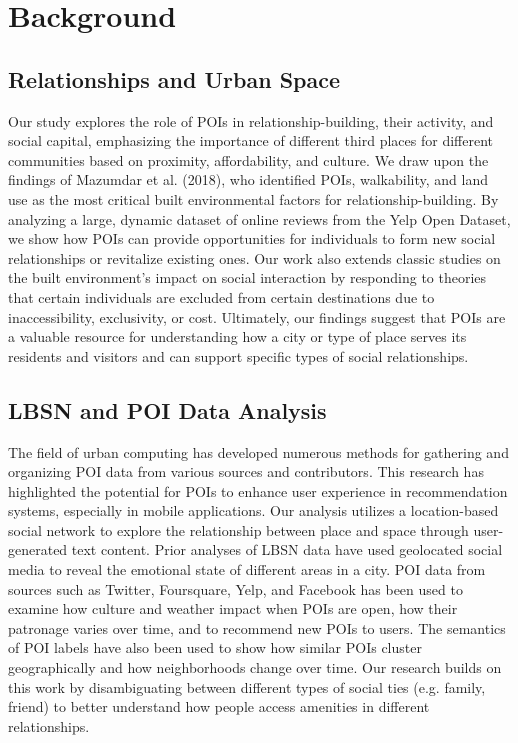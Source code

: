 \section{Background}
\subsection{Relationships and Urban Space}

Our study explores the role of POIs in relationship-building, their activity, and social capital, emphasizing the importance of different third places for different communities based on proximity, affordability, and culture\cite{b3}. We draw upon the findings of Mazumdar et al. (2018), who identified POIs, walkability, and land use as the most critical built environmental factors for relationship-building. By analyzing a large, dynamic dataset of online reviews from the Yelp Open Dataset, we show how POIs can provide opportunities for individuals to form new social relationships or revitalize existing ones. Our work also extends classic studies on the built environment's impact on social interaction by responding to theories that certain individuals are excluded from certain destinations due to inaccessibility, exclusivity, or cost. Ultimately, our findings suggest that POIs are a valuable resource for understanding how a city or type of place serves its residents and visitors and can support specific types of social relationships.

\subsection{LBSN and POI Data Analysis}
The field of urban computing has developed numerous methods for gathering and organizing POI data from various sources and contributors\cite{b4}. This research has highlighted the potential for POIs to enhance user experience in recommendation systems, especially in mobile applications. Our analysis utilizes a location-based social network to explore the relationship between place and space through user-generated text content. Prior analyses of LBSN data have used geolocated social media to reveal the emotional state of different areas in a city. POI data from sources such as Twitter, Foursquare, Yelp, and Facebook has been used to examine how culture and weather impact when POIs are open, how their patronage varies over time, and to recommend new POIs to users. The semantics of POI labels have also been used to show how similar POIs cluster geographically and how neighborhoods change over time. Our research builds on this work by disambiguating between different types of social ties (e.g. family, friend) to better understand how people access amenities in different relationships.

